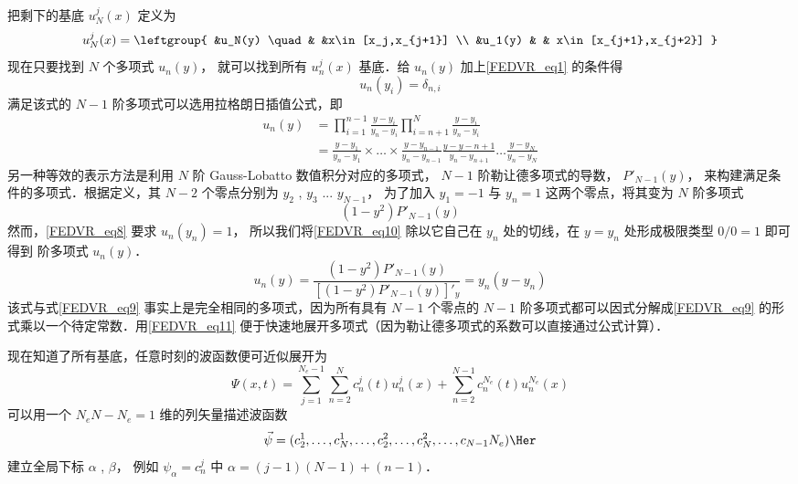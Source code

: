 把剩下的基底 $u_N^j(x)$ 定义为
\begin{equation}
u_N^j(x) = \leftgroup{
&u_N(y) \quad & &x\in[x_j,x_{j+1}] \\
&u_1(y)  & & x\in[x_{j+1},x_{j+2}]
}\end{equation}
现在只要找到 $N$ 个多项式 $u_n(y)$， 就可以找到所有 $u_n^j(x)$ 基底．给 $u_n(y)$ 加上\autoref{FEDVR_eq1} 的条件得
\begin{equation}\label{FEDVR_eq8}
u_n(y_i) = \delta_{n,i}
\end{equation}
满足该式的 $N-1$ 阶多项式可以选用拉格朗日插值公式，即
\begin{equation}\label{FEDVR_eq9}\begin{aligned}
u_n(y) &= \prod_{i=1}^{n-1} \frac{y-y_i}{y_n-y_i} \prod_{i=n+1}^{N} \frac{y-y_i}{y_n-y_i}\\
&= \frac{y-y_1}{y_n-y_1} \times\dots\times\frac{y-y_{n-1}}{y_n-y_{n-1}}\frac{y-y-{n+1}}{y_n-y_{n+1}} \dots \frac{y-y_N}{y_n-y_N}
\end{aligned}\end{equation}
另一种等效的表示方法是利用 $N$ 阶 Gauss-Lobatto 数值积分对应的多项式， $N-1$ 阶勒让德多项式的导数， $P'_{N-1}(y)$，  来构建满足条件的多项式．根据定义，其 $N-2$ 个零点分别为 $y_2$ , $y_3$ ... $y_{N-1}$， 为了加入 $y_1=-1$ 与 $y_n=1$ 这两个零点，将其变为 $N$ 阶多项式
\begin{equation}\label{FEDVR_eq10}
(1-y^2)P'_{N-1}(y)
\end{equation}
然而，\autoref{FEDVR_eq8} 要求 $u_n(y_n)=1$， 所以我们将\autoref{FEDVR_eq10} 除以它自己在 $y_n$ 处的切线，在 $y=y_n$ 处形成极限类型 $0/0=1$ 即可得到 阶多项式 $u_n(y)$． 
\begin{equation}\label{FEDVR_eq11}
u_n(y) = \frac{(1-y^2)P'_{N-1}(y)}{[(1-y^2)P'_{N-1}(y)]'_y} = y_n (y-y_n)
\end{equation}
该式与式\autoref{FEDVR_eq9} 事实上是完全相同的多项式，因为所有具有 $N-1$ 个零点的 $N-1$ 阶多项式都可以因式分解成\autoref{FEDVR_eq9} 的形式乘以一个待定常数．用\autoref{FEDVR_eq11} 便于快速地展开多项式（因为勒让德多项式的系数可以直接通过公式计算）．

现在知道了所有基底，任意时刻的波函数便可近似展开为
\begin{equation}
\Psi(x,t) = \sum_{j=1}^{N_e-1}\sum_{n=2}^{N} c_n^j(t) u_n^j(x) + \sum_{n=2}^{N-1} c_n^{N_e}(t) u_n^{N_e}(x)
\end{equation}
可以用一个 $N_eN-N_e=1$ 维的列矢量描述波函数
\begin{equation}
\vec\psi = (c_2^1,\dots,c_N^1,\dots,c_2^2,\dots,c_N^2,\dots,c_{N-1}{N_e})\Her
\end{equation}
建立全局下标 $\alpha$ , $\beta$， 例如 $\psi_\alpha=c_n^j$ 中 $\alpha=(j-1)(N-1)+(n-1)$． 


